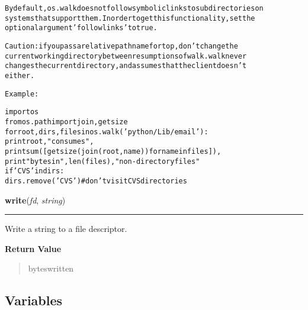 \begin{boxedminipage}{\funcwidth}
\begin{alltt}
By default, os.walk does not follow symbolic links to subdirectories on
systems that support them.  In order to get this functionality, set the
optional argument 'followlinks' to true.

Caution:  if you pass a relative pathname for top, don't change the
current working directory between resumptions of walk.  walk never
changes the current directory, and assumes that the client doesn't
either.

Example:

import os
from os.path import join, getsize
for root, dirs, files in os.walk('python/Lib/email'):
    print root, "consumes",
    print sum([getsize(join(root, name)) for name in files]),
    print "bytes in", len(files), "non-directory files"
    if 'CVS' in dirs:
        dirs.remove('CVS')  \# don't visit CVS directories
\end{alltt}

\setlength{\parskip}{1ex}
    \end{boxedminipage}

    \label{os:write}

    \vspace{0.5ex}

\hspace{.8\funcindent}\begin{boxedminipage}{\funcwidth}

    \raggedright \textbf{write}(\textit{fd}, \textit{string})

    \vspace{-1.5ex}

    \rule{\textwidth}{0.5\fboxrule}
\setlength{\parskip}{2ex}
    Write a string to a file descriptor.

\setlength{\parskip}{1ex}
      \textbf{Return Value}
    \vspace{-1ex}

      \begin{quote}
      byteswritten

      \end{quote}

    \end{boxedminipage}



  \subsection{Variables}

